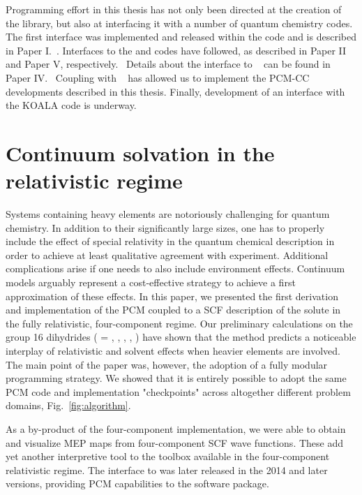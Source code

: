 Programming effort in this thesis has not only been directed at the
creation of the \pcmsolver library, but also at interfacing it with a
number of quantum chemistry codes.
The first interface was implemented and released within the \DIRAC code
and is described in Paper I.~\autocite{DIRAC15, DiRemigio2015-ou}.
Interfaces to the \LSDALTON\autocite{LSDALTON16, Aidas2013-rp} and
\DALTON\autocite{LSDALTON16, Aidas2013-rp} codes have followed, as
described in Paper II and Paper V, respectively.~\autocite{Bugeanu2015-tp, pcm-openrsp}
Details about the interface to \ReSpect~\autocite{ReSpect-3.5.0} can be
found in Paper IV.~\autocite{pcm-respect}
Coupling with \psicode~\autocite{Turney2012-de} has allowed us to implement the
\acs{PCM}-\acs{CC} developments described in this thesis.
Finally, development of an interface with the KOALA code is underway.~\autocite{Hofener2014-ex, Hofener2016-qz}

\section{Continuum solvation in the relativistic regime}\label{sec:relapcm}

Systems containing heavy elements are notoriously challenging for quantum chemistry.
In addition to their significantly large sizes, one has to properly include the
effect of special relativity in the quantum chemical description in order to
achieve at least qualitative agreement with experiment.
Additional complications arise if one needs to also include environment effects.
Continuum models arguably represent a cost-effective strategy to achieve a first
approximation of these effects.
In this paper, we presented the first derivation and implementation of the \acs{PCM}
coupled to a \acs{SCF} description of the solute in the fully relativistic, four-component
regime.
Our preliminary calculations on the group 16 dihydrides  ( =
, , , , ) have shown that the method predicts
a noticeable interplay of relativistic and solvent effects when heavier
elements are involved.
The main point of the paper was, however, the adoption of a fully modular
programming strategy. We showed that it is entirely possible to adopt the same
\acs{PCM} code and implementation "checkpoints" across altogether different
problem domains, Fig.~\ref{fig:algorithm}.

As a by-product of the four-component implementation, we were able to obtain and visualize \acs{MEP} maps
from four-component \acs{SCF} wave functions. These add yet another interpretive tool to the toolbox available
in the four-component relativistic regime.
The interface to \DIRAC was later released in the 2014 and later versions,
providing \acs{PCM} capabilities to the software package.

